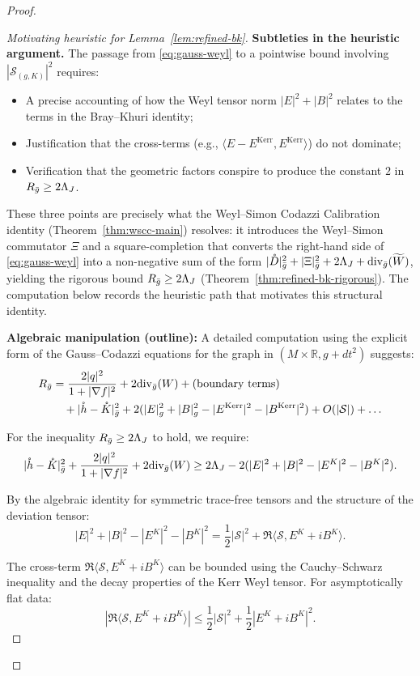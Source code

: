 \begin{proof}
\begin{proof}[Motivating heuristic for Lemma~\ref{lem:refined-bk}]
\textbf{Subtleties in the heuristic argument.} The passage from \eqref{eq:gauss-weyl} to a pointwise bound involving $|\mathcal{S}_{(g,K)}|^2$ requires:
\begin{itemize}
\item A precise accounting of how the Weyl tensor norm $|E|^2 + |B|^2$ relates to the terms in the Bray--Khuri identity;
\item Justification that the cross-terms (e.g., $\langle E - E^{\mathrm{Kerr}}, E^{\mathrm{Kerr}}\rangle$) do not dominate;
\item Verification that the geometric factors conspire to produce the constant $2$ in $R_{\bar{g}} \geq 2\Lambda_J$.
\end{itemize}
These three points are precisely what the Weyl--Simon Codazzi Calibration identity (Theorem~\ref{thm:wscc-main}) resolves: it introduces the Weyl--Simon commutator $\Xi$ and a square-completion that converts the right-hand side of \eqref{eq:gauss-weyl} into a non-negative sum of the form $|\mathring{D}|^2_{\bar{g}}+|\Xi|^2_{\bar{g}}+2\Lambda_J+\mathrm{div}_{\bar{g}}(\widetilde W)$, yielding the rigorous bound $R_{\bar{g}}\geq 2\Lambda_J$ (Theorem~\ref{thm:refined-bk-rigorous}). The computation below records the heuristic path that motivates this structural identity.

\textbf{Algebraic manipulation (outline):} A detailed computation using the explicit form of the Gauss--Codazzi equations for the graph in $(M \times \mathbb{R}, g + dt^2)$ suggests:
\begin{align}
R_{\bar{g}} &= \frac{2|q|^2}{1 + |\nabla f|^2} + 2\mathrm{div}_{\bar{g}}(W) + \text{(boundary terms)} \nonumber\\
&\quad + |\mathring{h} - \mathring{K}|^2_{\bar{g}} + 2(|E|^2_g + |B|^2_g - |E^{\mathrm{Kerr}}|^2 - |B^{\mathrm{Kerr}}|^2) + O(|\mathcal{S}|) + \ldots
\end{align}

For the inequality $R_{\bar{g}} \geq 2\Lambda_J$ to hold, we require:
\[
|\mathring{h} - \mathring{K}|^2_{\bar{g}} + \frac{2|q|^2}{1 + |\nabla f|^2} + 2\mathrm{div}_{\bar{g}}(W) \geq 2\Lambda_J - 2(|E|^2 + |B|^2 - |E^K|^2 - |B^K|^2).
\]

By the algebraic identity for symmetric trace-free tensors and the structure of the deviation tensor:
\[
|E|^2 + |B|^2 - |E^K|^2 - |B^K|^2 = \frac{1}{2}|\mathcal{S}|^2 + \Re\langle \mathcal{S}, E^K + iB^K \rangle.
\]

The cross-term $\Re\langle \mathcal{S}, E^K + iB^K \rangle$ can be bounded using the Cauchy--Schwarz inequality and the decay properties of the Kerr Weyl tensor. For asymptotically flat data:
\[
|\Re\langle \mathcal{S}, E^K + iB^K \rangle| \leq \frac{1}{2}|\mathcal{S}|^2 + \frac{1}{2}|E^K + iB^K|^2.
\]


\end{proof}
\end{proof}

